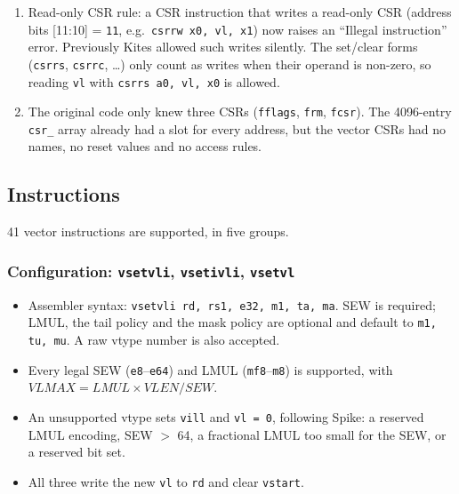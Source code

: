 \documentclass{article}
\begin{document}
\begin{enumerate}
\begin{table}[h]
\begin{tabular}{|c|c|p{9cm}|}
    \end{tabular}
    \caption{RISC-V Vector Extension Control and Status Registers}
    \label{tab:vector_csrs}
\end{table}
    \item Read-only CSR rule: a CSR instruction that writes a read-only CSR (address bits
    [11:10] = \texttt{11}, e.g.\ \texttt{csrrw x0, vl, x1}) now raises an ``Illegal instruction''
    error. Previously Kites allowed such writes silently. The set/clear forms
    (\texttt{csrrs}, \texttt{csrrc}, \ldots) only count as writes when their operand is non-zero,
    so reading \texttt{vl} with \texttt{csrrs a0, vl, x0} is allowed.
    \item The original code only knew three CSRs (\texttt{fflags}, \texttt{frm}, \texttt{fcsr}).
    The 4096-entry \texttt{csr\_} array already had a slot for every address, but the vector CSRs
    had no names, no reset values and no access rules.
\end{enumerate}

\subsection{Instructions}
41 vector instructions are supported, in five groups.

\subsubsection*{Configuration: \texttt{vsetvli}, \texttt{vsetivli}, \texttt{vsetvl}}
\begin{itemize}
    \item Assembler syntax: \texttt{vsetvli rd, rs1, e32, m1, ta, ma}. SEW is required; LMUL, the
    tail policy and the mask policy are optional and default to \texttt{m1, tu, mu}. A raw vtype
    number is also accepted.
    \item Every legal SEW (\texttt{e8}--\texttt{e64}) and LMUL (\texttt{mf8}--\texttt{m8}) is
    supported, with $VLMAX = LMUL \times VLEN / SEW$.
    \item An unsupported vtype sets \texttt{vill} and \texttt{vl = 0}, following Spike: a
    reserved LMUL encoding, SEW $>$ 64, a fractional LMUL too small for the SEW, or a reserved bit
    set.
    \item All three write the new \texttt{vl} to \texttt{rd} and clear \texttt{vstart}.
\end{itemize}
\end{document}
